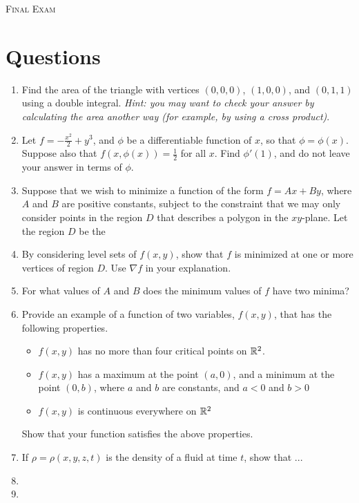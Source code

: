 \documentclass{article}
\date{}
\begin{document}
\begin{center}
\textsc{\LARGE Final Exam}\\[0.5cm]
\end{center}
\section*{Questions}

\begin{enumerate}
\item %
Find the area of the triangle with vertices $(0,0,0)$, $(1,0,0)$, and $(0,1,1)$ using a double integral. \textit{Hint: you may want to check your answer by calculating the area another way (for example, by using a cross product)}.

\item %
Let $f=-\frac{x^2}{2}+y^3$, and $\phi$ be a differentiable function of $x$, so that $\phi = \phi(x)$. Suppose also that $f(x,\phi(x))=\frac{1}{2}$ for all $x$. Find $\phi'(1)$, and do not leave your answer in terms of $\phi$.
\item %
Suppose that we wish to minimize a function of the form $f=Ax+By$, where $A$ and $B$ are positive constants, subject to the constraint that we may only consider points in the region $D$ that describes a polygon in the $xy$-plane. Let the region $D$ be the 
\BEN
\item By considering level sets of $f(x,y)$, show that $f$ is minimized at one or more vertices of region $D$. Use $\nabla f$ in your explanation. 
\item For what values of $A$ and $B$ does the minimum values of $f$ have two minima? 
\EEN
\item %
Provide an example of a function of two variables, $f(x,y)$, that has the following properties. 
\begin{itemize}
  \item $f(x,y)$ has no more than four critical points on $\mathbb{R}^2$.
  \item $f(x,y)$ has a maximum at the point $(a,0)$, and a minimum at the point $(0,b)$, where $a$ and $b$ are constants, and $a<0$ and $b>0$
  \item $f(x,y)$ is continuous everywhere on $\mathbb{R}^2$
\end{itemize}
Show that your function satisfies the above properties. 
\item %
If $\rho=\rho(x,y,z,t)$ is the density of a fluid at time $t$, show that ...
\item %
\item %


\end{enumerate}
\end{document}
